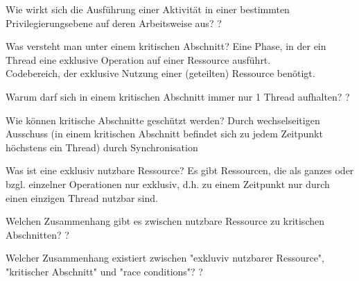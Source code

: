 \documentclass[avery5371]{flashcards}
\begin{document}
\begin{flashcard}[Privilegierungsebenen]{Wie wirkt sich die Ausführung einer Aktivität in einer bestimmten Privilegierungsebene auf deren Arbeitsweise aus?}
    ?
\end{flashcard}

\begin{flashcard}{Was versteht man unter einem kritischen Abschnitt?}
    Eine Phase, in der ein Thread eine exklusive Operation auf einer Ressource ausführt.\\
    Codebereich, der exklusive Nutzung einer (geteilten) Ressource benötigt.
\end{flashcard}

\begin{flashcard}{Warum darf sich in einem kritischen Abschnitt immer nur 1 Thread aufhalten?}
    ?
\end{flashcard}

\begin{flashcard}{Wie können kritische Abschnitte geschützt werden?}
    Durch wechselseitigen Ausschuss (in einem kritischen Abschnitt befindet sich zu jedem Zeitpunkt höchstens ein Thread) durch Synchronisation
\end{flashcard}

\begin{flashcard}{Was ist eine exklusiv nutzbare Ressource?}
    Es gibt Ressourcen, die als ganzes oder bzgl. einzelner Operationen nur exklusiv, d.h. zu einem Zeitpunkt nur durch einen einzigen Thread nutzbar sind.
\end{flashcard}

\begin{flashcard}{Welchen Zusammenhang gibt es zwischen nutzbare Ressource zu kritischen Abschnitten?}
    ?
\end{flashcard}

\begin{flashcard}{Welcher Zusammenhang existiert zwischen "exkluviv nutzbarer Ressource", "kritischer Abschnitt" und "race conditions"?}
    ?
\end{flashcard}
\end{document}
